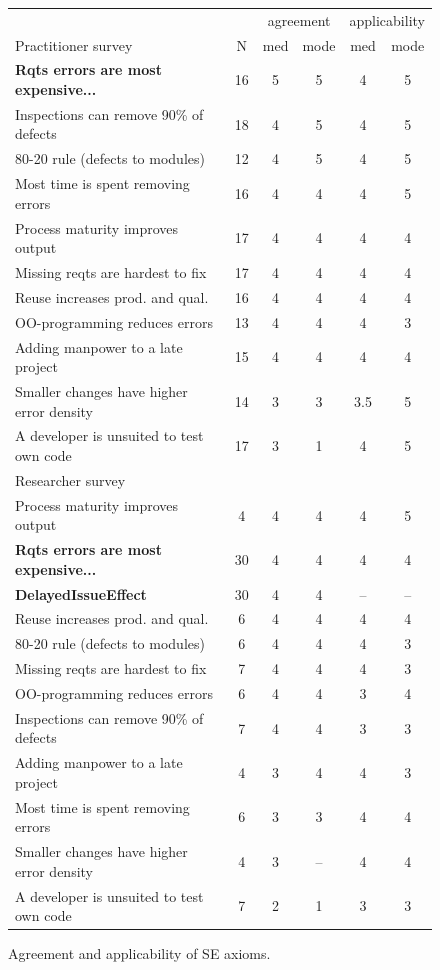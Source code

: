 \documentclass[smallcondesed]{svjour3}
\begin{document}
\begin{figure}[!ht] 
\scriptsize 
 \begin{center}
\begin{tabular}{l|c|c|c|c|c}
 &  & \multicolumn{2}{c|}{agreement} & \multicolumn{2}{c}{applicability} \\\cline{1-1} 
Practitioner survey  & N & med & mode & med & mode \\
\hline 
\textbf{Rqts errors are most expensive...} & 16 & 5 & 5 & 4 & 5 \\ 
Inspections can remove 90\% of defects & 18 & 4 & 5 & 4 & 5 \\
80-20 rule (defects to modules) & 12 & 4 & 5 & 4 & 5 \\
Most time is spent removing errors & 16 & 4 & 4 & 4 & 5 \\ 
Process maturity improves output & 17 & 4 & 4 & 4 & 4 \\ 
Missing reqts are hardest to fix & 17 & 4 & 4 & 4 & 4 \\
Reuse increases prod. and qual. & 16 & 4 & 4 & 4 & 4 \\
OO-programming reduces errors & 13 & 4 & 4 & 4 & 3 \\
Adding manpower to a late project & 15 & 4 & 4 & 4 & 4 \\
Smaller changes have higher error density & 14 & 3 & 3 & 3.5 & 5 \\
A developer is unsuited to test own code & 17 & 3 & 1 & 4 & 5\\\hline
 
Researcher survey \\\hline 
Process maturity improves output & 4 & 4 & 4 & 4 & 5 \\
\textbf{Rqts errors are most expensive...} & 30 & 4 & 4 & 4 & 4   \\ 
\textbf{DelayedIssueEffect} & 30 & 4 & 4 & -- & --  \\
Reuse increases prod. and qual. & 6 & 4 & 4 & 4 & 4 \\
80-20 rule (defects to modules) & 6 & 4 & 4 & 4 & 3 \\
Missing reqts are hardest to fix & 7 & 4 & 4 & 4 & 3 \\
OO-programming reduces errors & 6 & 4 & 4 & 3 & 4 \\
Inspections can remove 90\% of defects & 7 & 4 & 4 & 3 & 3 \\
Adding manpower to a late project & 4 & 3 & 4 & 4 & 3 \\
Most time is spent removing errors & 6 & 3 & 3 & 4 & 4 \\ 
Smaller changes have higher error density & 4 & 3 & -- & 4 & 4 \\
A developer is unsuited to test own code & 7 & 2 & 1 & 3 & 3
\end{tabular} 
 \end{center}
\caption{Agreement and applicability of SE axioms.}
\label{fig:survey_results}
\end{figure}
\end{document}
